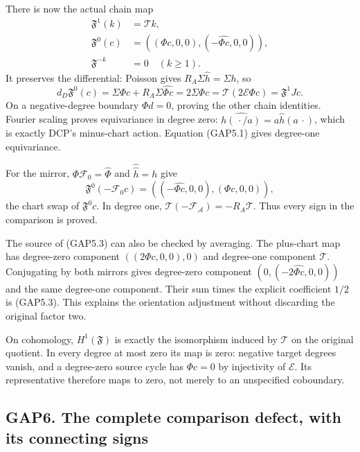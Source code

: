 There is now the actual chain map \[
\begin{aligned}
\mathfrak F^1(k)&=\mathcal T k,\\
\mathfrak F^0(c)&=((\Phi c,0,0),(-\widehat{\Phi c},0,0)),\\
\mathfrak F^{-k}&=0\quad(k\ge1).
\end{aligned}
\tag{GAP5.3}
\] It preserves the differential: Poisson gives
\(R_A\Sigma\widehat h=\Sigma h\), so \[
d_D\mathfrak F^0(c)=\Sigma\Phi c+R_A\Sigma\widehat{\Phi c}
=2\Sigma\Phi c=\mathcal T(2\mathcal E\Phi c)=\mathfrak F^1Jc.
\tag{GAP5.4}
\] On a negative-degree boundary \(\Phi d=0\), proving the other chain
identities. Fourier scaling proves equivariance in degree zero:
\(\widehat{h(\,\cdot/a)}=a\widehat h(a\,\cdot)\), which is exactly DCP's
minus-chart action. Equation (GAP5.1) gives degree-one equivariance.

For the mirror, \(\Phi\mathcal F_0=\widehat{\Phi}\) and
\(\widehat{\widehat h}=h\) give \[
\mathfrak F^0(-\mathcal F_0c)=((-\widehat{\Phi c},0,0),(\Phi c,0,0)),
\] the chart swap of \(\mathfrak F^0c\). In degree one,
\(\mathcal T(-\mathcal F_{\mathcal A})=-R_A\mathcal T\). Thus every sign
in the comparison is proved.

The source of (GAP5.3) can also be checked by averaging. The plus-chart
map has degree-zero component \(((2\Phi c,0,0),0)\) and degree-one
component \(\mathcal T\). Conjugating by both mirrors gives degree-zero
component \((0,(-2\widehat{\Phi c},0,0))\) and the same degree-one
component. Their sum times the explicit coefficient \(1/2\) is (GAP5.3).
This explains the orientation adjustment without discarding the original
factor two.

On cohomology, \(H^1(\mathfrak F)\) is exactly the isomorphism induced
by \(\mathcal T\) on the original quotient. In every degree at most zero
its map is zero: negative target degrees vanish, and a degree-zero
source cycle has \(\Phi c=0\) by injectivity of \(\mathcal E\). Its
representative therefore maps to zero, not merely to an unspecified
coboundary.

\subsection{GAP6. The complete comparison defect, with its connecting
signs}\label{gap6.-the-complete-comparison-defect-with-its-connecting-signs}

